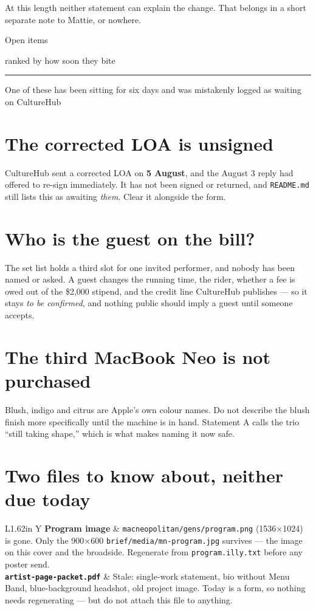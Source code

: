 \documentclass[10pt,letterpaper]{article}
\renewcommand{\packettitle}[2]{%
  {\acbold\fontsize{22pt}{24pt}\selectfont\color{acdark}#1\par}%
  \vspace{0.10em}%
  {\hyphenpenalty=10000\exhyphenpenalty=10000\RaggedRight
   \aclight\fontsize{11.5pt}{13.5pt}\selectfont\color{acpink}#2\par}%
  \vspace{0.22em}\color{acpink}\rule{\linewidth}{1pt}\color{black}\vspace{0.14em}%
}
\renewcommand{\pageclaim}[1]{%
  {\hyphenpenalty=10000\exhyphenpenalty=10000\RaggedRight
   \aclight\fontsize{12.5pt}{15pt}\selectfont\color{acpink}#1\par}\vspace{0.18em}}
\begin{document}
At this length neither statement can explain the change. That belongs in a short
separate note to Mattie, or nowhere.

\clearpage
\packettitle{Open items}{ranked by how soon they bite}

\pageclaim{One of these has been sitting for six days and was mistakenly
logged as waiting on CultureHub}

\section{The corrected LOA is unsigned}
\par
CultureHub sent a corrected LOA on \textbf{5 August}, and the August 3 reply
had offered to re-sign immediately. It has not been signed or returned, and
\texttt{README.md} still lists this as awaiting \emph{them}. Clear it alongside
the form.

\section{Who is the guest on the bill?}
\par
The set list holds a third slot for one invited performer, and nobody has been
named or asked. A guest changes the running time, the rider, whether a fee is
owed out of the \$2,000 stipend, and the credit line CultureHub publishes — so it
stays \emph{to be confirmed}, and nothing public should imply a guest until
someone accepts.

\section{The third MacBook Neo is not purchased}
\par
Blush, indigo and citrus are Apple's own colour names. Do not describe the blush
finish more specifically until the machine is in hand. Statement A calls the trio
``still taking shape,'' which is what makes naming it now safe.

\section{Two files to know about, neither due today}
{\tighttable
\begin{tabularx}{\linewidth}{L{1.62in} Y}
\toprule
\textbf{Program image} & \texttt{macneopolitan/gens/program.png} (1536×1024) is gone. Only the 900×600 \texttt{brief/media/mn-program.jpg} survives — the image on this cover and the broadside. Regenerate from \texttt{program.illy.txt} before any poster send. \\
\textbf{\texttt{artist-page-packet.pdf}} & Stale: single-work statement, bio without Menu Band, blue-background headshot, old project image. Today is a form, so nothing needs regenerating — but do not attach this file to anything. \\
\bottomrule
\end{tabularx}}
\end{document}
